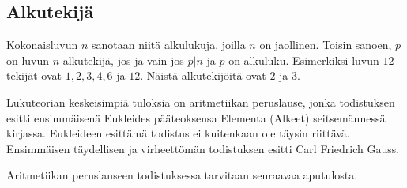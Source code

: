 \subsection*{Alkutekijä} Kokonaisluvun $n$  sanotaan niitä alkulukuja, joilla $n$ on jaollinen. Toisin sanoen, $p$ on luvun $n$ alkutekijä, jos ja vain jos $p|n$ ja $p$ on alkuluku.  Esimerkiksi luvun $12$ tekijät ovat $1, 2, 3, 4, 6$ ja $12$. Näistä alkutekijöitä ovat $2$ ja $3$.


Lukuteorian keskeisimpiä tuloksia on aritmetiikan peruslause, jonka todistuksen esitti ensimmäisenä Eukleides pääteoksensa Elementa (Alkeet) seitsemännessä kirjassa. Eukleideen esittämä todistus ei kuitenkaan ole täysin riittävä. Ensimmäisen täydellisen ja virheettömän todistuksen esitti Carl Friedrich Gauss.


Aritmetiikan peruslauseen todistuksessa tarvitaan seuraavaa aputulosta.


